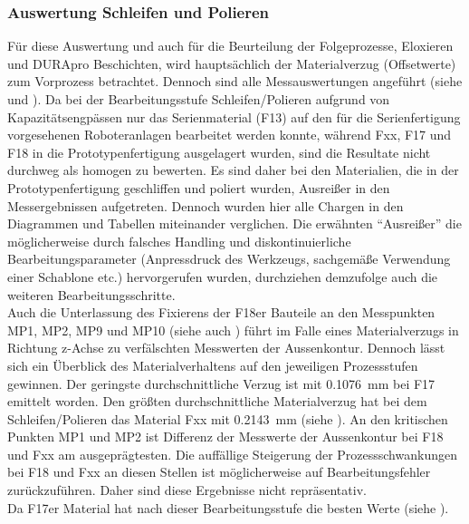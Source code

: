\documentclass[12pt,a4paper,parskip,twoside,BCOR5mm,headsepline]{scrartcl}
\begin{document}
\begin{description*}
\subsubsection{Auswertung Schleifen und Polieren }
Für diese Auswertung und auch für die Beurteilung der Folgeprozesse,  Eloxieren und DURApro Beschichten,    
wird hauptsächlich der Materialverzug (Offsetwerte) zum Vorprozess betrachtet. Dennoch sind alle  Messauswertungen angeführt (siehe  und ). Da bei der Bearbeitungsstufe Schleifen/Polieren aufgrund von Kapazitätsengpässen nur das Serienmaterial (F13) auf den für die Serienfertigung vorgesehenen Roboteranlagen bearbeitet werden konnte,  während Fxx, F17 und F18 in die Prototypenfertigung ausgelagert wurden, sind die Resultate nicht durchweg als homogen zu bewerten. Es sind daher bei den Materialien,  die in der Prototypenfertigung geschliffen und poliert wurden, Ausreißer in den Messergebnissen aufgetreten. Dennoch wurden hier alle Chargen in den Diagrammen und Tabellen miteinander verglichen. Die erwähnten "`Ausreißer"' die möglicherweise durch falsches Handling und diskontinuierliche Bearbeitungsparameter (Anpressdruck des Werkzeugs, sachgemäße Verwendung einer Schablone etc.) hervorgerufen wurden,  durchziehen demzufolge auch die weiteren Bearbeitungsschritte. \\
Auch die Unterlassung des Fixierens der F18er Bauteile an den Messpunkten MP1, MP2, MP9 und MP10 (siehe auch ) führt im Falle eines Materialverzugs in Richtung z-Achse zu verfälschten Messwerten der Aussenkontur. Dennoch lässt sich ein Überblick des Materialverhaltens auf den jeweiligen Prozessstufen gewinnen.
Der geringste durchschnittliche Verzug ist mit \SI{0,1076}{\milli\meter} bei F17 emittelt worden. Den größten durchschnittliche Materialverzug hat bei dem Schleifen/Polieren das Material Fxx mit \SI{0,2143}{\milli\meter} (siehe ). An den kritischen Punkten MP1 und MP2 ist Differenz der Messwerte der Aussenkontur bei F18 und Fxx am ausgeprägtesten. Die auffällige Steigerung der Prozessschwankungen bei F18 und Fxx an diesen Stellen ist möglicherweise auf Bearbeitungsfehler zurückzuführen. Daher sind diese Ergebnisse nicht repräsentativ.     \\
Da F17er Material hat nach dieser Bearbeitungsstufe die besten Werte (siehe ). 



\end{description*}
\end{document}
